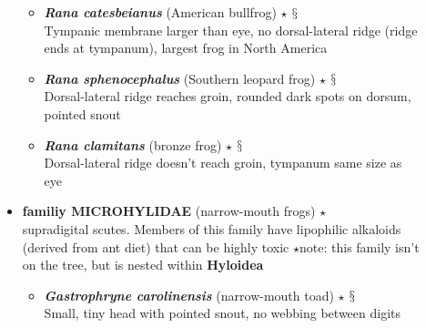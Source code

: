 \documentclass[a4paper,12pt]{article}
\begin{document}
\begin{description}
\begin{itemize}
\begin{itemize}
    \item{\textbf{\textit{   Rana catesbeianus}} (American bullfrog) $\star$ $\mathsection$} \\ Tympanic membrane larger than eye, no dorsal-lateral ridge (ridge ends at tympanum), largest frog in North America
    \item{\textbf{\textit{   Rana sphenocephalus}} (Southern leopard frog) $\star$ $\mathsection$} \\ Dorsal-lateral ridge reaches groin, rounded dark spots on dorsum, pointed snout
    \item{\textbf{\textit{   Rana clamitans}} (bronze frog) $\star$ $\mathsection$} \\ Dorsal-lateral ridge doesn't reach groin, tympanum same size as eye
  \end{itemize}
  \item{\textbf{familiy MICROHYLIDAE} (narrow-mouth frogs) $\star$} \\ supradigital scutes. Members of this family have lipophilic alkaloids (derived from ant diet) that can be highly toxic $\star$note: this family isn't on the tree, but is nested within \textbf{Hyloidea}
  \begin{itemize}
    \item{\textbf{\textit{   Gastrophryne carolinensis}} (narrow-mouth toad) $\star$ $\mathsection$} \\ Small, tiny head with pointed snout, no webbing between digits
  \end{itemize}\end{itemize}
\end{description}
\end{document}
